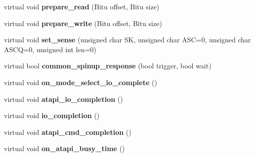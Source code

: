 \begin{DoxyCompactItemize}
\item 
\hypertarget{classIDEATAPICDROMDevice_a5ad63645768cdaaacdb32b133d357768}{virtual void {\bfseries prepare\-\_\-read} (Bitu offset, Bitu size)}\label{classIDEATAPICDROMDevice_a5ad63645768cdaaacdb32b133d357768}

\item 
\hypertarget{classIDEATAPICDROMDevice_abb361d1191a9e673e5ae2e26215e5e86}{virtual void {\bfseries prepare\-\_\-write} (Bitu offset, Bitu size)}\label{classIDEATAPICDROMDevice_abb361d1191a9e673e5ae2e26215e5e86}

\item 
\hypertarget{classIDEATAPICDROMDevice_aa9c9e1b85c8e4715dc22a2e97171c163}{virtual void {\bfseries set\-\_\-sense} (unsigned char S\-K, unsigned char A\-S\-C=0, unsigned char A\-S\-C\-Q=0, unsigned int len=0)}\label{classIDEATAPICDROMDevice_aa9c9e1b85c8e4715dc22a2e97171c163}

\item 
\hypertarget{classIDEATAPICDROMDevice_aa2cd10dadb8a407c6576bddece23a45d}{virtual bool {\bfseries common\-\_\-spinup\-\_\-response} (bool trigger, bool wait)}\label{classIDEATAPICDROMDevice_aa2cd10dadb8a407c6576bddece23a45d}

\item 
\hypertarget{classIDEATAPICDROMDevice_aef7969279bffa8b4513076ddcb25a3cc}{virtual void {\bfseries on\-\_\-mode\-\_\-select\-\_\-io\-\_\-complete} ()}\label{classIDEATAPICDROMDevice_aef7969279bffa8b4513076ddcb25a3cc}

\item 
\hypertarget{classIDEATAPICDROMDevice_ac028d999d90f21f20df61c8b5df19baf}{virtual void {\bfseries atapi\-\_\-io\-\_\-completion} ()}\label{classIDEATAPICDROMDevice_ac028d999d90f21f20df61c8b5df19baf}

\item 
\hypertarget{classIDEATAPICDROMDevice_a2c96f54764050498601b600fec041b80}{virtual void {\bfseries io\-\_\-completion} ()}\label{classIDEATAPICDROMDevice_a2c96f54764050498601b600fec041b80}

\item 
\hypertarget{classIDEATAPICDROMDevice_a629eca83d8028b44506aed8ab35d58d2}{virtual void {\bfseries atapi\-\_\-cmd\-\_\-completion} ()}\label{classIDEATAPICDROMDevice_a629eca83d8028b44506aed8ab35d58d2}

\item 
\hypertarget{classIDEATAPICDROMDevice_a4baf9f71c10e70fcd1b0c7a32dc668a8}{virtual void {\bfseries on\-\_\-atapi\-\_\-busy\-\_\-time} ()}\label{classIDEATAPICDROMDevice_a4baf9f71c10e70fcd1b0c7a32dc668a8}


\end{DoxyCompactItemize}
